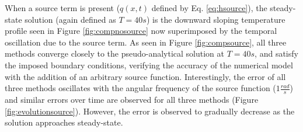 \documentclass[10pt, letter, showtrims]{extarticle}
\begin{document}
		\pagebreak
		
		\noindent
		When a source term is present ($q(x,t)$ defined by Eq. \ref{eq:hsource}), the steady-state solution (again defined as $T = 40s$) is the downward sloping temperature profile seen in Figure \ref{fig:compnosource} now superimposed by the temporal oscillation due to the source term. As seen in Figure \ref{fig:compsource}, all three methods converge closely to the pseudo-analytical solution at $T = 40 s$, and satisfy the imposed boundary conditions, verifying the accuracy of the numerical model with the addition of an arbitrary source function. Interestingly, the error of all three methods oscillates with the angular frequency of the source function ($1 \frac{rad}{s}$) and similar errors over time are observed for all three methods (Figure \ref{fig:evolutionsource}). However, the error is observed to gradually decrease as the solution approaches steady-state.
			
\end{document}

